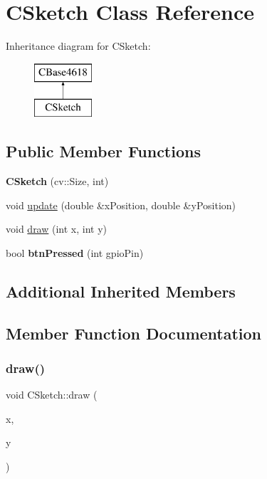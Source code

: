 \hypertarget{class_c_sketch}{}\section{C\+Sketch Class Reference}
\label{class_c_sketch}
Inheritance diagram for C\+Sketch\+:\begin{figure}[H]
\begin{center}
\leavevmode
\includegraphics[height=2.000000cm]{class_c_sketch}
\end{center}
\end{figure}
\subsection*{Public Member Functions}
\begin{DoxyCompactItemize}
\item 
\hypertarget{class_c_sketch_aa426bb25ef429d04103b180863dbc11a}{}\label{class_c_sketch_aa426bb25ef429d04103b180863dbc11a} 
{\bfseries C\+Sketch} (cv\+::\+Size, int)
\item 
void \hyperlink{class_c_sketch_a81582a1c6eb7524db76546565412a88b}{update} (double \&x\+Position, double \&y\+Position)
\item 
void \hyperlink{class_c_sketch_a9b5af655812ecfa15791f5199854a3a4}{draw} (int x, int y)
\item 
\hypertarget{class_c_sketch_a9e73bdd4ab788236c1a682459d6a6075}{}\label{class_c_sketch_a9e73bdd4ab788236c1a682459d6a6075} 
bool {\bfseries btn\+Pressed} (int gpio\+Pin)
\end{DoxyCompactItemize}
\subsection*{Additional Inherited Members}


\subsection{Member Function Documentation}
\hypertarget{class_c_sketch_a9b5af655812ecfa15791f5199854a3a4}{}\label{class_c_sketch_a9b5af655812ecfa15791f5199854a3a4} 
\subsubsection{\texorpdfstring{draw()}{draw()}}
{\footnotesize\ttfamily void C\+Sketch\+::draw (\begin{DoxyParamCaption}\item[{int}]{x,  }\item[{int}]{y }\end{DoxyParamCaption})\hspace{0.3cm}{\ttfamily [virtual]}}

